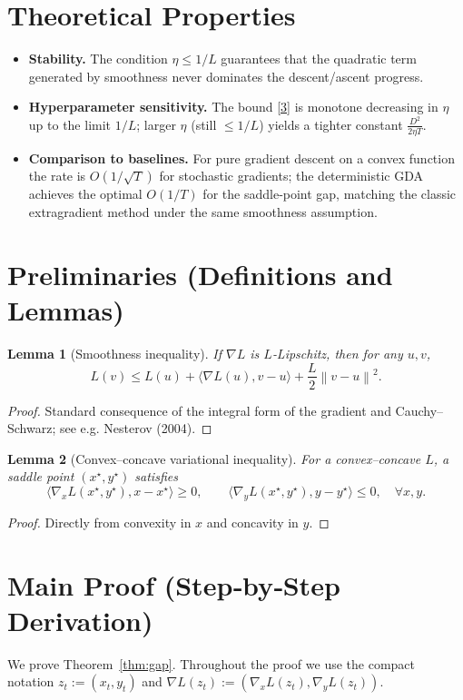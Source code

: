\documentclass{article}
\newtheorem{lemma}{Lemma}
\newcommand{\norm}[1]{\left\lVert#1\right\rVert}
\begin{document}
\section*{Theoretical Properties}
\begin{itemize}
\item \textbf{Stability.} The condition $\eta\le 1/L$ guarantees that the quadratic term generated by smoothness never dominates the descent/ascent progress.
\item \textbf{Hyperparameter sensitivity.} The bound \eqref{3} is monotone decreasing in $\eta$ up to the limit $1/L$; larger $\eta$ (still $\le 1/L$) yields a tighter constant $\frac{D^2}{2\eta T}$.
\item \textbf{Comparison to baselines.} For pure gradient descent on a convex function the rate is $O(1/\sqrt{T})$ for stochastic gradients; the deterministic GDA achieves the optimal $O(1/T)$ for the saddle‑point gap, matching the classic extragradient method under the same smoothness assumption.
\end{itemize}

\section*{Preliminaries (Definitions and Lemmas)}
\begin{lemma}[Smoothness inequality]\label{lem:smooth}
If $\nabla L$ is $L$‑Lipschitz, then for any $u,v$,
\[
L(v)\le L(u)+\langle\nabla L(u),v-u\rangle+\frac{L}{2}\norm{v-u}^2 .
\tag{4}
\]
\end{lemma}
\begin{proof}
Standard consequence of the integral form of the gradient and Cauchy–Schwarz; see e.g. Nesterov (2004). \qedhere
\end{proof}

\begin{lemma}[Convex–concave variational inequality]\label{lem:vi}
For a convex–concave $L$, a saddle point $(x^\star ,y^\star)$ satisfies
\[
\langle \nabla_x L(x^\star ,y^\star),x-x^\star\rangle\ge 0,\qquad
\langle \nabla_y L(x^\star ,y^\star),y-y^\star\rangle\le 0,
\quad\forall x,y .
\tag{5}
\]
\end{lemma}
\begin{proof}
Directly from convexity in $x$ and concavity in $y$. \qedhere
\end{proof}

\section*{Main Proof (Step‑by‑Step Derivation)}
We prove Theorem~\ref{thm:gap}. Throughout the proof we use the compact notation $z_t:=(x_t,y_t)$ and $\nabla L(z_t):=(\nabla_x L(z_t),\nabla_y L(z_t))$.
\end{document}

